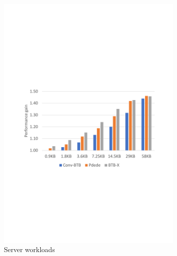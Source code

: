 \begin{figure}
    \centering
    \begin{subfigure}[t]{0.935\columnwidth}
        \centering
        \includegraphics[width=0.935\columnwidth, trim=70 235 60 250, clip]{figures/ISOStorage_server_revised.pdf}
        \caption{Server workloads}
        \label{fig:serverPerf}
    \end{subfigure}
    ~ %
    \begin{subfigure}[t]{0.935\columnwidth}
        \centering

\end{subfigure}
\end{figure}
